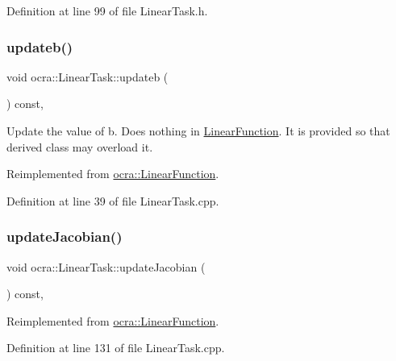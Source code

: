 Definition at line 99 of file Linear\+Task.\+h.

\hypertarget{classocra_1_1LinearTask_a83fc0c9f16a8338d3e66db91fef2a319}{}\label{classocra_1_1LinearTask_a83fc0c9f16a8338d3e66db91fef2a319} 
\subsubsection{\texorpdfstring{updateb()}{updateb()}}
{\footnotesize\ttfamily void ocra\+::\+Linear\+Task\+::updateb (\begin{DoxyParamCaption}{ }\end{DoxyParamCaption}) const\hspace{0.3cm}{\ttfamily [protected]}, {\ttfamily [virtual]}}

Update the value of b. Does nothing in \hyperlink{classocra_1_1LinearFunction}{Linear\+Function}. It is provided so that derived class may overload it. 

Reimplemented from \hyperlink{classocra_1_1LinearFunction_a546454cd8d0909f99433ffc0e700c9e3}{ocra\+::\+Linear\+Function}.



Definition at line 39 of file Linear\+Task.\+cpp.

\hypertarget{classocra_1_1LinearTask_a9d2845b746d3af713458b9246b011328}{}\label{classocra_1_1LinearTask_a9d2845b746d3af713458b9246b011328} 
\subsubsection{\texorpdfstring{update\+Jacobian()}{updateJacobian()}}
{\footnotesize\ttfamily void ocra\+::\+Linear\+Task\+::update\+Jacobian (\begin{DoxyParamCaption}{ }\end{DoxyParamCaption}) const\hspace{0.3cm}{\ttfamily [protected]}, {\ttfamily [virtual]}}



Reimplemented from \hyperlink{classocra_1_1LinearFunction_a30926f977c0124a0b0f65b854ab39636}{ocra\+::\+Linear\+Function}.



Definition at line 131 of file Linear\+Task.\+cpp.



